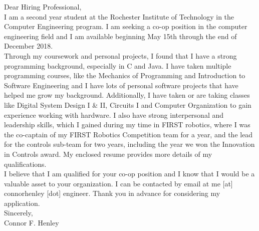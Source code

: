 \documentclass[line,margin]{res}
\begin{document}
\setlength\columnsep{-30pt}
\email{} %
\phone{} %
\address{} %
\address{} %
\website{} %

\begin{resume}
 \setlength
 \multicolsep{2pt}
 \begin{adjustwidth}{-92pt}{0pt}
 \vspace{10pt}

\noindent
Dear Hiring Professional, \\

\noindent
I am a second year student at the Rochester Institute of Technology in the Computer Engineering program. I am seeking a co-op position in the computer engineering field and I am available beginning May 15th through the end of December 2018. \\

\noindent
Through my coursework and personal projects, I found that I have a strong programming background, especially in C and Java. I have taken multiple programming courses, like the Mechanics of Programming and Introduction to Software Engineering and I have lots of personal software projects that have helped me grow my background. Additionally, I have taken or are taking classes like Digital System Design I \& II, Circuits I and Computer Organization to gain experience working with hardware. I also have strong interpersonal and leadership skills, which I gained during my time in FIRST robotics, where I was the co-captain of my FIRST Robotics Competition team for a year, and the lead for the controls sub-team for two years, including the year we won the Innovation in Controls award. My enclosed resume provides more details of my qualifications. \\

\noindent
I believe that I am qualified for your co-op position and I know that I would be a valuable asset to your organization. I can be contacted by email at me [at] connorhenley [dot] engineer. Thank you in advance for considering my application. \\

Sincerely, \\
Connor F. Henley

\end{adjustwidth}
\end{resume}
\end{document}
